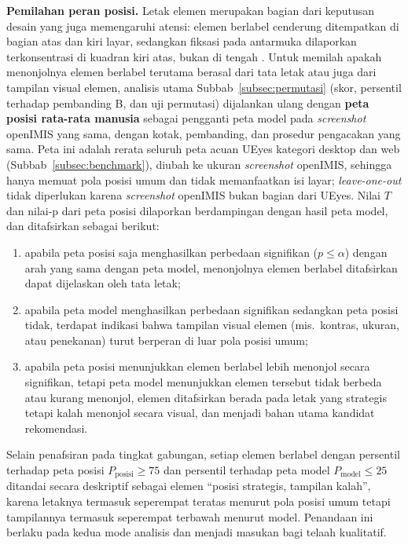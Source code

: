 \textbf{Pemilahan peran posisi.} Letak elemen merupakan bagian dari keputusan desain yang juga memengaruhi atensi: elemen berlabel cenderung ditempatkan di bagian atas dan kiri layar, sedangkan fiksasi pada antarmuka dilaporkan terkonsentrasi di kuadran kiri atas, bukan di tengah \citep{jiang2023ueyes}. Untuk memilah apakah menonjolnya elemen berlabel terutama berasal dari tata letak atau juga dari tampilan visual elemen, analisis utama Subbab~\ref{subsec:permutasi} (skor, persentil terhadap pembanding B, dan uji permutasi) dijalankan ulang dengan \textbf{peta posisi rata-rata manusia} sebagai pengganti peta model pada \emph{screenshot} openIMIS yang sama, dengan kotak, pembanding, dan prosedur pengacakan yang sama. Peta ini adalah rerata seluruh peta acuan UEyes kategori desktop dan web (Subbab~\ref{subsec:benchmark}), diubah ke ukuran \emph{screenshot} openIMIS, sehingga hanya memuat pola posisi umum dan tidak memanfaatkan isi layar; \emph{leave-one-out} tidak diperlukan karena \emph{screenshot} openIMIS bukan bagian dari UEyes. Nilai $T$ dan nilai-p dari peta posisi dilaporkan berdampingan dengan hasil peta model, dan ditafsirkan sebagai berikut:
\begin{enumerate}
  \item apabila peta posisi saja menghasilkan perbedaan signifikan ($p \leq \alpha$) dengan arah yang sama dengan peta model, menonjolnya elemen berlabel ditafsirkan dapat dijelaskan oleh tata letak;
  \item apabila peta model menghasilkan perbedaan signifikan sedangkan peta posisi tidak, terdapat indikasi bahwa tampilan visual elemen (mis.\ kontras, ukuran, atau penekanan) turut berperan di luar pola posisi umum;
  \item apabila peta posisi menunjukkan elemen berlabel lebih menonjol secara signifikan, tetapi peta model menunjukkan elemen tersebut tidak berbeda atau kurang menonjol, elemen ditafsirkan berada pada letak yang strategis tetapi kalah menonjol secara visual, dan menjadi bahan utama kandidat rekomendasi.
\end{enumerate}

Selain penafsiran pada tingkat gabungan, setiap elemen berlabel dengan persentil terhadap peta posisi $P_{\text{posisi}} \geq 75$ dan persentil terhadap peta model $P_{\text{model}} \leq 25$ ditandai secara deskriptif sebagai elemen ``posisi strategis, tampilan kalah'', karena letaknya termasuk seperempat teratas menurut pola posisi umum tetapi tampilannya termasuk seperempat terbawah menurut model. Penandaan ini berlaku pada kedua mode analisis dan menjadi masukan bagi telaah kualitatif.

